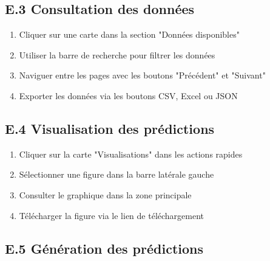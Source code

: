 
\subsection*{E.3 Consultation des données}

\begin{enumerate}
    \item Cliquer sur une carte dans la section "Données disponibles"
    \item Utiliser la barre de recherche pour filtrer les données
    \item Naviguer entre les pages avec les boutons "Précédent" et "Suivant"
    \item Exporter les données via les boutons CSV, Excel ou JSON
\end{enumerate}


\subsection*{E.4 Visualisation des prédictions}

\begin{enumerate}
    \item Cliquer sur la carte "Visualisations" dans les actions rapides
    \item Sélectionner une figure dans la barre latérale gauche
    \item Consulter le graphique dans la zone principale
    \item Télécharger la figure via le lien de téléchargement
\end{enumerate}


\subsection*{E.5 Génération des prédictions}

